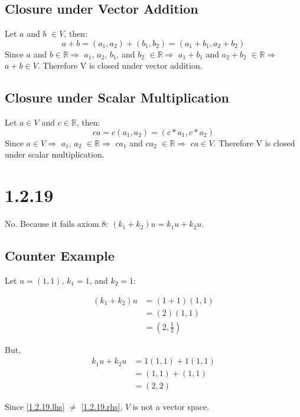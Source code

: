\documentclass{article}
\begin{document}
\noindent

\subsection*{Closure under Vector Addition}
Let $a$ and $b$ $\in V$, then:
\begin{equation*}
  a + b = (a_1, a_2) + (b_1, b_2)= (a_1 + b_1, a_2 + b_2)  
\end{equation*}
\noindent
Since $a$ and $b \in \mathbb{R} \Rightarrow$ $a_1$, $a_2$, $b_1$, and $b_2$ $\in \mathbb{R} \Rightarrow$ $a_1+b_1$ and $a_2+b_2$ $\in \mathbb{R} \Rightarrow$ $a+b \in V$. Therefore V is closed under vector addition.

\subsection*{Closure under Scalar Multiplication}
Let $a \in V$ and $c \in \mathbb{R}$, then:
\begin{equation*}
  ca = c(a_1, a_2) = (c*a_1, c* a_2)  
\end{equation*}
\noindent
Since $a \in V \Rightarrow$ $a_1$, $a_2$ $\in \mathbb{R} \Rightarrow$ $ca_1$ and $ca_2$ $\in \mathbb{R} \Rightarrow$ $ca \in V$. Therefore V is closed under scalar multiplication.

\section*{1.2.19}
No. Because it fails axiom 8: $(k_1 + k_2)u = k_1u + k_2u$.

\subsection*{Counter Example}
Let $u=(1,1)$, $k_1=1$, and $k_2=1$:

\begin{align}
  (k_1 + k_2)u &= (1+1)(1,1) \nonumber \\
  &= (2)(1,1) \nonumber \\
  &= (2, \frac{1}{2}) \label{1.2.19.lhs}
\end{align}

\noindent
But,
\begin{align}
  k_1u + k_2u &= 1(1,1) + 1(1,1) \nonumber \\
  &= (1,1) + (1,1) \nonumber \\
  &= (2, 2) \label{1.2.19.rhs}
\end{align}

\noindent
Since \eqref{1.2.19.lhs} $\neq$ \eqref{1.2.19.rhs}, $V$ is not a vector space.
\end{document}
